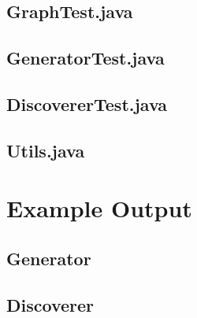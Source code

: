 \documentclass[12pt, titlepage, a4paper, oneside]{article}
\begin{document}
\subsection*{GraphTest.java}

\newpage

\subsection*{GeneratorTest.java}

\newpage

\subsection*{DiscovererTest.java}

\newpage

\subsection*{Utils.java}

\newpage

\section*{Example Output}

\subsection*{Generator}

\par

\par


\subsection*{Discoverer}

\par

\par

\end{document}
